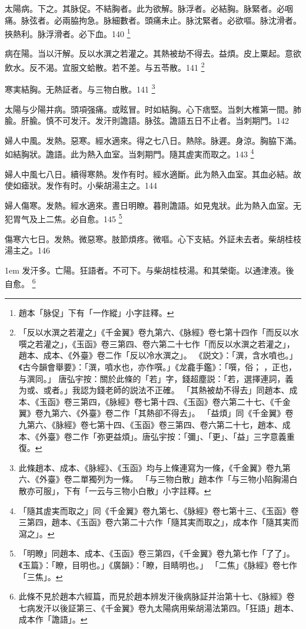 太陽病。下之。其脉促。不結胸者。此为欲解。脉浮者。必結胸。脉緊者。必咽痛。脉弦者。必兩脇拘急。脉細數者。頭痛未止。脉沈緊者。必欲嘔。脉沈滑者。挾熱利。脉浮滑者。必下血。140
	\footnote{
		趙本「脉促」下有「一作縱」小字註釋。
	}

病在陽。当以汗解。反以水潠之若灌之。其熱被劫不得去。益煩。皮上粟起。意欲飲水。反不渴。宜服文蛤散。若不差。与五苓散。141
	\footnote{
		「反以水潠之若灌之」《千金翼》卷九第六、《脉經》卷七第十四作「而反以水噀之若灌之」，《玉函》卷三第四、卷六第二十七作「而反以水潠之若灌之」，趙本、成本、《外臺》卷二作「反以冷水潠之」。
		《説文》：「潠，含水噴也。」《古今韻會舉要》：「潠，噴水也，亦作噀。」《龙龕手鑑》：「噀，俗；{\sungii 𠹀}，正也，与潠同。」
		唐弘宇按：關於此條的「若」字，錢超塵説：「若，選擇連詞，義为或、或者。」我認为錢老師的説法不正確。%
		「其熱被劫不得去」同趙本、成本、《玉函》卷三第四，《脉經》卷七第十四、《玉函》卷六第二十七、《千金翼》卷九第六、《外臺》卷二作「其熱卻不得去」。
		「益煩」同《千金翼》卷九第六、《脉經》卷七第十四、《玉函》卷三第四、卷六第二十七，趙本、成本、《外臺》卷二作「弥更益煩」。唐弘宇按：「彌」、「更」、「益」三字意義重復。
	}

寒実結胸。无熱証者。与三物白散。141
	\footnote{
		此條趙本、成本、《脉經》、《玉函》均与上條連寫为一條，《千金翼》卷九第六、《外臺》卷二單獨列为一條。
		「与三物白散」趙本作「与三物小陷胸湯白散亦可服」，下有「一云与三物小白散」小字註釋。
	}

太陽与少陽并病。頭項强痛。或眩冒。时如結胸。心下痞堅。当刺大椎第一間。肺腧。肝腧。慎不可发汗。发汗則譫語。脉弦。譫語五日不止者。当刺期門。142

婦人中風。发熱。惡寒。經水適來。得之七八日。熱除。脉遲。身涼。胸脇下滿。如結胸狀。譫語。此为熱入血室。当刺期門。隨其{\khaai 虗}実而取之。143
	\footnote{
		「隨其虗実而取之」同《千金翼》卷九第七、《脉經》卷七第十三、《玉函》卷三第四，趙本、《玉函》卷六第二十六作「隨其実而取之」，成本作「隨其実而瀉之」。
	}

婦人中風七八日。續得寒熱。发作有时。經水適斷。此为熱入血室。其血必結。故使如瘧狀。发作有时。小柴胡湯主之。144

婦人傷寒。发熱。經水適來。晝日明瞭。暮則譫語。如見鬼狀。此为熱入血室。无犯胃气及上二焦。必自愈。145
	\footnote{
		「明瞭」同趙本、成本、《玉函》卷三第四，《千金翼》卷九第七作「了了」。《玉篇》：「瞭，目明也。」《廣韻》：「瞭，目睛明也。」
		「二焦」《脉經》卷七作「三焦」。
	}

傷寒六七日。发熱。微惡寒。肢節煩疼。微嘔。心下支結。外証未去者。柴胡桂枝湯主之。146

\hangindent 1em
发汗多。亡陽。狂語者。不可下。与柴胡桂枝湯。和其榮衛。以通津液。後自愈。
	\footnote{
		此條不見於趙本六經篇，而見於趙本辨发汗後病脉証并治第十七、《脉經》卷七病发汗以後証第三、《千金翼》卷九太陽病用柴胡湯法第四。「狂語」趙本、成本作「譫語」。
	}

